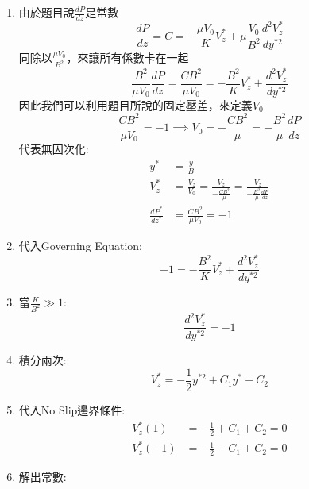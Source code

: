 \documentclass[../main.tex]{subfiles}
\begin{document}
\begin{itemize}
\begin{enumerate}
    故:
    \begin{equation}
      y^\ast = \frac{y}{B},\quad V_z^\ast = \frac{V_z}{V_0}
    \end{equation}
    \item 由於題目說$\frac{dP}{dz}$是常數
    \begin{equation}
      \frac{dP}{dz} = C = -\frac{\mu V_0}{K} V_z^\ast + \mu \frac{V_0}{B^2} \frac{d^2 V_z^\ast}{dy^{\ast 2}}
    \end{equation}
    同除以$\frac{\mu V_0}{B^2}$，來讓所有係數卡在一起
    \begin{equation}
      \frac{B^2}{\mu V_0} \frac{dP}{dz}  = \frac{CB^2}{\mu V_0} = -\frac{B^2}{K} V_z^\ast + \frac{d^2 V_z^\ast}{dy^{\ast 2}}
    \end{equation}
    因此我們可以利用題目所說的固定壓差，來定義$V_0$
    \begin{equation}
      \frac{CB^2}{\mu V_0} = -1 \implies V_0 = -\frac{CB^2}{\mu} = -\frac{B^2}{\mu} \frac{dP}{dz}
    \end{equation}
    代表無因次化:
    \begin{align}
      y^\ast &= \frac{y}{B} \nonumber\\
       V_z^\ast &= \frac{V_z}{V_0} = \frac{V_z}{-\frac{CB^2}{\mu}} = \frac{V_z}{-\frac{B^2}{\mu} \frac{dP}{dz}} \nonumber\\
      \frac{dP^\ast}{dz^\ast} &= \frac{CB^2}{\mu V_0} = -1
    \end{align}
    \item 代入Governing Equation:
    \begin{equation}
      -1 = -\frac{B^2}{K} V_z^\ast + \frac{d^2 V_z^\ast}{dy^{\ast 2}}
    \end{equation}
    \item 當$\frac{K}{B^2}\gg1$:
    \begin{equation}
      \frac{d^2 V_z^\ast}{dy^{\ast 2}} = -1
    \end{equation}
    \item 積分兩次:
    \begin{equation}
      V_z^\ast = -\frac{1}{2} y^{\ast 2} + C_1 y^\ast + C_2
    \end{equation}
    \item 代入No Slip邊界條件:
    \begin{align}
      V_z^\ast(1) &= -\frac{1}{2} + C_1 + C_2 = 0\\
      V_z^\ast(-1) &= -\frac{1}{2} - C_1 + C_2 = 0 
    \end{align}
    \item 解出常數:

\end{enumerate}
\end{itemize}
\end{document}
